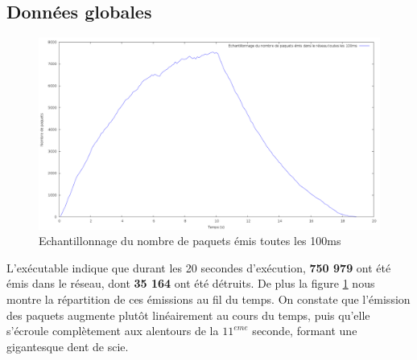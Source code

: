 \documentclass[
10pt, %
a4paper, %
oneside, %
headinclude,footinclude, %
BCOR5mm, %
]{scrartcl}
\begin{document}
\subsection{Données globales}
\begin{figure}
	\centerfloat
    \includegraphics[width=19cm]{png/total_packets.png}
	\caption{Echantillonnage du nombre de paquets émis toutes les 100ms}
   \label{total_packets}
\end{figure}
L'exécutable indique que durant les 20 secondes d'exécution, \textbf{750 979} ont été émis dans le réseau, dont \textbf{35 164} ont été détruits. De plus la figure \ref{total_packets} nous montre la répartition de ces émissions au fil du temps. On constate que l'émission des paquets augmente plutôt linéairement au cours du temps, puis qu'elle s'écroule complètement aux alentours de la $11^{eme} $ seconde, formant une gigantesque dent de scie.
\end{document}
